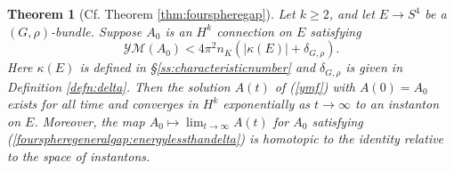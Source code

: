 \documentclass[12pt]{amsart}
\newcommand{\YM}{\mathcal{YM}}
\renewcommand{\1}{{\mathbf 1}}
\newtheorem{thm}{Theorem}[section]
\theoremstyle{others}
\numberwithin{equation}{section}
\begin{document}
\begin{thm}[Cf. Theorem \ref{thm:fourspheregap}]\label{thm:fourspheregeneralgap}
Let \(k \geq 2\), and let $E \to S^4$ be a $(G, \rho)$-bundle. Suppose \(A_0\) is an \(H^k\) connection on \(E\) satisfying
\begin{equation}\label{fourspheregeneralgap:energylessthandelta}
\YM(A_0) < 4 \pi^2 n_{K}\left( |\kappa(E)|+ \delta_{G, \rho} \right).
\end{equation}
Here $\kappa(E)$ is defined in \S \ref{ss:characteristicnumber} and $\delta_{G, \rho}$ is given in Definition \ref{defn:delta}.
Then the solution \(A(t)\) of (\ref{ymf}) with \(A(0) = A_0\) exists for all time and converges in \(H^k\) exponentially as \(t \to \infty\) to an instanton on $E$. Moreover, the map $A_0 \mapsto \lim_{t \to \infty} A(t)$ for \(A_0\) satisfying (\ref{fourspheregeneralgap:energylessthandelta}) is homotopic to the identity relative to the %
space of instantons.
\end{thm}
\end{document}
